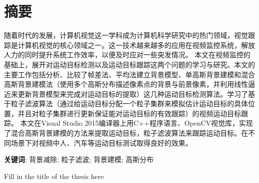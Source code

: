 \documentclass[UTF8, twoside]{ctexart}
\begin{document}
\titlespacing*{\section}{0pt}{0pt}{0pt}
\vspace*{0.6cm}
\section*{摘\quad 要}
\vspace*{0.2cm}
随着时代的发展，计算机视觉这一学科成为计算机科学研究中的热门领域，视觉跟踪是计算机视觉的核心领域之一。这一技术越来越多的应用在视频监控系统，解放人力的同时提升系统工作效率，以便及时应对一些突发情况。
本文在视频监控的基础上，展开对运动目标检测以及运动目标跟踪这两个问题的学习与研究。本文的主要工作包括分析、比较了帧差法、平均法建立背景模型、单高斯背景建模和混合高斯背景建模法（使用多个高斯分布描述像素点的背景与前景像素，并利用线性逼近来更新背景模型来完成对运动目标的提取）这几种运动目标检测算法。学习了基于粒子滤波算法（通过给运动目标分配一个粒子集群来模拟估计运动目标的具体位置，并且对粒子集群进行更新保证能对运动目标的有效跟踪）的视频运动目标跟踪。
本文在Visual Studio 2015编译器上用C++程序语言、OpenCV视觉库，实现了混合高斯背景建模的方法来提取运动目标，粒子滤波算法来跟踪运动目标。在不同场景下对视频中人、汽车等运动目标测试取得良好的效果。

\vspace{1.4em}
\noindent\textbf{关键词}: 背景减除; 粒子滤波; 背景建模; 高斯分布
\newpage


\begingroup
\centering %
\arialfont\bfseries %
\fontsize{14}{16}\selectfont %
\parbox{0.8\textwidth}{\centering
    Fill in the title of the thesis here
}\par
\endgroup

\vspace*{1cm}
\end{document}
